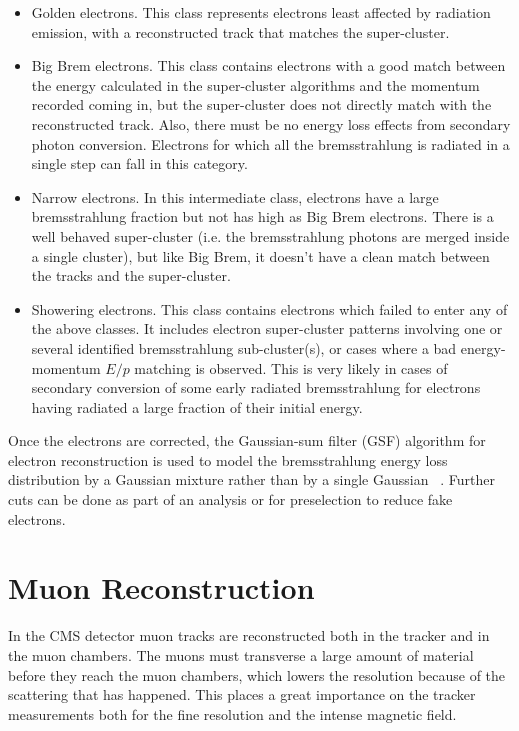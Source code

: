 \begin{itemize}
\item
  Golden electrons. This class represents electrons least affected by radiation emission, with a reconstructed track that matches the super-cluster. 
\item
  Big Brem electrons. This class contains electrons with a good match between the energy calculated in the super-cluster algorithms and the momentum recorded coming in, but the super-cluster does not directly match with the reconstructed track.  Also, there must be no energy loss effects from secondary photon conversion. Electrons for which all the bremsstrahlung is radiated in a single step can fall in this category.
\item
  Narrow electrons. In this intermediate class, electrons have a large bremsstrahlung fraction but not has high as Big Brem electrons.  There is a well behaved super-cluster (i.e. the bremsstrahlung photons are merged inside a single cluster), but like Big Brem, it doesn't have a clean match between the tracks and the super-cluster.
\item
  Showering electrons. This class contains electrons which failed to enter any of the above classes. It includes electron super-cluster patterns involving one or several identified bremsstrahlung sub-cluster(s), or cases where a bad energy-momentum $E/p$ matching is observed. This is very likely in cases of secondary conversion of some early radiated bremsstrahlung for electrons having radiated a large fraction of their initial energy.
\end{itemize}

Once the electrons are corrected, the Gaussian-sum filter (GSF) algorithm for electron reconstruction is used to model the bremsstrahlung energy loss distribution by a Gaussian mixture rather than by a single Gaussian ~\cite{GSF_at_CMS}. Further cuts can be done as part of an analysis or for preselection to reduce fake electrons.

\section{Muon Reconstruction}

In the CMS detector muon tracks are reconstructed both in the tracker and in the muon chambers.  The muons must transverse a large amount of material before they reach the muon chambers, which lowers the resolution because of the scattering that has happened. This places a great importance on the tracker measurements both for the fine resolution and the intense magnetic field. 

